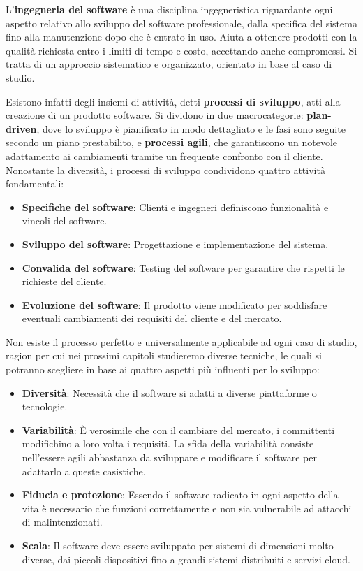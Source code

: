 L'\textbf{ingegneria del software} è una disciplina ingegneristica riguardante ogni aspetto relativo allo sviluppo del software professionale, dalla specifica del sistema fino alla manutenzione dopo che è entrato in uso. Aiuta a ottenere prodotti con la qualità richiesta entro i limiti di tempo e costo, accettando anche compromessi. Si tratta di un approccio sistematico e organizzato, orientato in base al caso di studio.\par 
Esistono infatti degli insiemi di attività, detti \textbf{processi di sviluppo}, atti alla creazione di un prodotto software. Si dividono in due macrocategorie: \textbf{plan-driven}, dove lo sviluppo è pianificato in modo dettagliato e le fasi sono seguite secondo un piano prestabilito, e \textbf{processi agili}, che garantiscono un notevole adattamento ai cambiamenti tramite un frequente confronto con il cliente. Nonostante la diversità, i processi di sviluppo condividono quattro attività fondamentali: \begin{itemize}
	\item \textbf{Specifiche del software}: Clienti e ingegneri definiscono funzionalità e vincoli del software.
	\item \textbf{Sviluppo del software}: Progettazione e implementazione del sistema.
	\item \textbf{Convalida del software}: Testing del software per garantire che rispetti le richieste del cliente.
	\item \textbf{Evoluzione del software}: Il prodotto viene modificato per soddisfare eventuali cambiamenti dei requisiti del cliente e del mercato.
\end{itemize}
\noindent Non esiste il processo perfetto e universalmente applicabile ad ogni caso di studio, ragion per cui nei prossimi capitoli studieremo diverse tecniche, le quali si potranno scegliere in base ai quattro aspetti più influenti per lo sviluppo: \begin{itemize}
	\item \textbf{Diversità}: Necessità che il software si adatti a diverse piattaforme o tecnologie.
	\item \textbf{Variabilità}: È verosimile che con il cambiare del mercato, i committenti modifichino a loro volta i requisiti. La sfida della variabilità consiste nell'essere agili abbastanza da sviluppare e modificare il software per adattarlo a queste casistiche.
	\item \textbf{Fiducia e protezione}: Essendo il software radicato in ogni aspetto della vita è necessario che funzioni correttamente e non sia vulnerabile ad attacchi di malintenzionati.
	\item \textbf{Scala}: Il software deve essere sviluppato per sistemi di dimensioni molto diverse, dai piccoli dispositivi fino a grandi sistemi distribuiti e servizi cloud.
\end{itemize}
